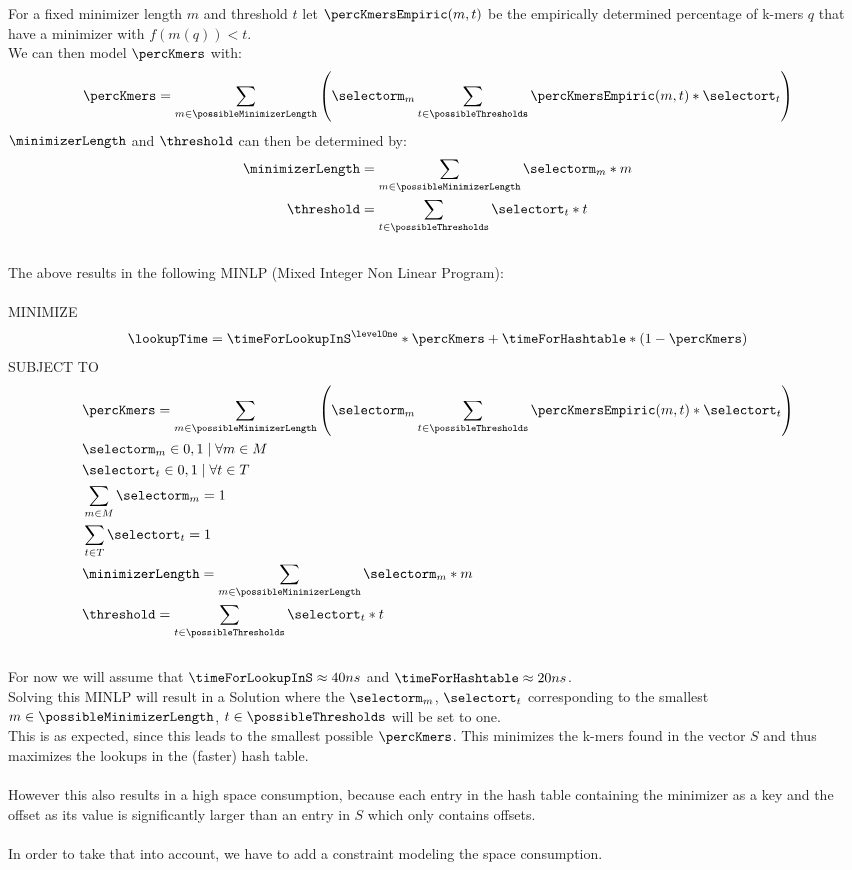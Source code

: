 For a fixed minimizer length $m$ and threshold $t$ let $\percKmersEmpiric(m, t)$ be the empirically determined percentage of k-mers $q$ that have a minimizer with $f(m(q)) < t$.\\
We can then model $\percKmers$ with:
\[ \percKmers = \sum_{m \in \possibleMinimizerLength} \left( \selectorm_m \sum_{t \in \possibleThresholds} \percKmersEmpiric(m, t) * \selectort_t\right) \]
$\minimizerLength$ and $\threshold$ can then be determined by:
\begin{align*}
	\minimizerLength &= \sum_{m \in \possibleMinimizerLength} \selectorm_m * m \\
	\threshold &= \sum_{t \in \possibleThresholds} \selectort_t * t
\end{align*}
\\
The above results in the following MINLP (Mixed Integer Non Linear Program):\\
\\
MINIMIZE
\begin{align*}
	\lookupTime = \timeForLookupInS^\levelOne * \percKmers + \timeForHashtable * (1-\percKmers)
\end{align*}
SUBJECT TO
\begin{align*}
		&\percKmers = \sum_{m \in \possibleMinimizerLength} \left( \selectorm_m \sum_{t \in \possibleThresholds} \percKmersEmpiric(m, t) * \selectort_t\right)\\
		&\selectorm_m \in {0,1} \mid \forall m \in M \\
		&\selectort_t \in {0,1} \mid \forall t \in T \\
		&\sum_{m \in M} \selectorm_m = 1 \\
		&\sum_{t \in T} \selectort_t = 1 \\
		&\minimizerLength = \sum_{m \in \possibleMinimizerLength} \selectorm_m * m \\
		&\threshold = \sum_{t \in \possibleThresholds} \selectort_t * t
\end{align*}
\\
For now we will assume that $\timeForLookupInS \approx 40ns$ and $\timeForHashtable \approx 20ns$.\\
Solving this MINLP will result in a Solution where the $\selectorm_m$, $\selectort_t$ corresponding to the smallest $m \in \possibleMinimizerLength$, $t \in \possibleThresholds$ will be set to one.\\
This is as expected, since this leads to the smallest possible $\percKmers$. This minimizes the k-mers found in the vector $S$ and thus maximizes the lookups in the (faster) hash table.\\
\\
However this also results in a high space consumption, because each entry in the hash table containing the minimizer as a key and the offset as its value is significantly larger than an entry in $S$ which only contains offsets.\\
\\
In order to take that into account, we have to add a constraint modeling the space consumption.\\

